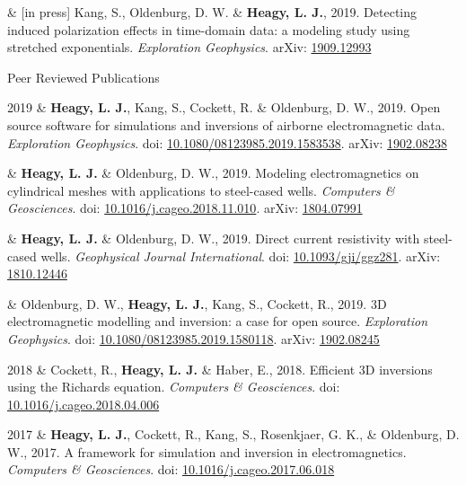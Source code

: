 \documentclass[a4paper, 11pt]{article}
\newcommand{\arxiv}[1]{arXiv: \href{https://arxiv.org/abs/#1}{#1}}
\newcommand{\doi}[1]{doi: \href{https://doi.org/#1}{#1}}
\newcommand{\subheading}[1]{
    \vspace{0.5cm}
    {\Large #1}\\
    \vspace{-0.2cm}
}
\begin{document}
\begin{entryright}
& [in press] Kang, S., Oldenburg, D. W. \& \textbf{Heagy, L. J.}, 2019. Detecting induced polarization effects in time-domain data: a modeling study using stretched exponentials. \emph{Exploration Geophysics}. \arxiv{1909.12993}
\end{entryright}


\subheading{Peer Reviewed Publications}

\begin{entryright}
2019 & \textbf{Heagy, L. J.}, Kang, S., Cockett, R. \& Oldenburg, D. W., 2019. Open source software for simulations and inversions of airborne electromagnetic data. \emph{Exploration Geophysics}. \doi{10.1080/08123985.2019.1583538}. \arxiv{1902.08238}
\end{entryright}

\begin{entryright}
& \textbf{Heagy, L. J.} \& Oldenburg, D. W., 2019. Modeling electromagnetics on cylindrical meshes with applications to steel-cased wells. \emph{Computers \& Geosciences}. \doi{10.1016/j.cageo.2018.11.010}. \arxiv{1804.07991}
\end{entryright}

\begin{entryright}
& \textbf{Heagy, L. J.} \& Oldenburg, D. W., 2019. Direct current resistivity with steel-cased wells. \emph{Geophysical Journal International}. \doi{10.1093/gji/ggz281}. \arxiv{1810.12446}
\end{entryright}

\begin{entryright}
& Oldenburg, D. W., \textbf{Heagy, L. J.}, Kang, S., Cockett, R., 2019. 3D electromagnetic modelling and inversion: a case for open source. \emph{Exploration Geophysics}. \doi{10.1080/08123985.2019.1580118}. \arxiv{1902.08245}
\end{entryright}

\begin{entryright}
2018 & Cockett, R., \textbf{Heagy, L. J.} \& Haber, E., 2018. Efficient 3D inversions using the Richards equation. \emph{Computers \& Geosciences}. \doi{10.1016/j.cageo.2018.04.006}
\end{entryright}

\begin{entryright}
2017 & \textbf{Heagy, L. J.}, Cockett, R., Kang, S., Rosenkjaer, G. K., \& Oldenburg, D. W., 2017. A framework for simulation and inversion in electromagnetics. \emph{Computers \& Geosciences}. \doi{10.1016/j.cageo.2017.06.018}
\end{entryright}
\end{document}
